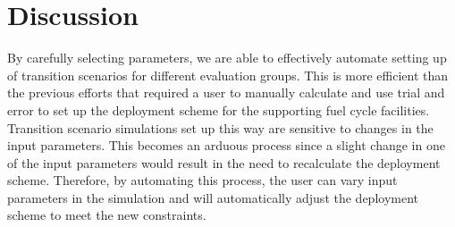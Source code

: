 \section{Discussion}

By carefully selecting \deploy parameters, we are able to 
effectively automate setting up of transition scenarios for 
different evaluation groups. 
This is more efficient than the previous efforts that
required a user to manually calculate and use trial and error 
to set up the deployment scheme for the supporting fuel cycle 
facilities. 
Transition scenario simulations set up this way are sensitive 
to changes in the input parameters. 
This becomes an arduous process since a slight change in one 
of the input parameters would result in the need to recalculate 
the deployment scheme.  
Therefore, by automating this process, the user can vary input parameters 
in the simulation and \deploy will automatically adjust the
deployment scheme to meet the new constraints. 